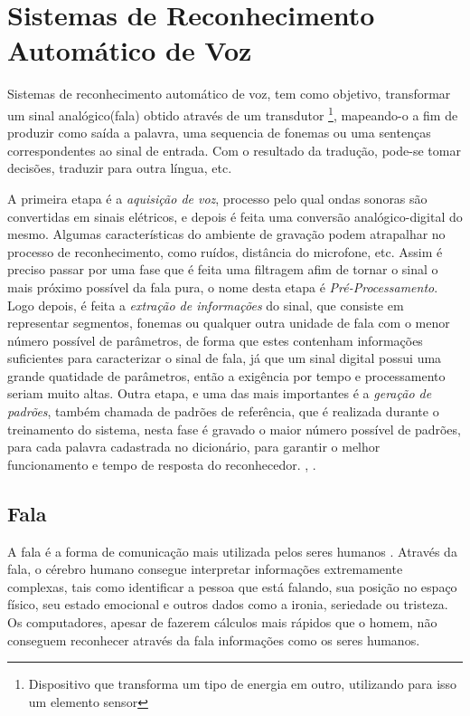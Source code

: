 \chapter{Sistemas de Reconhecimento Automático de Voz}

Sistemas de reconhecimento automático de voz, tem como objetivo, transformar um sinal analógico(fala) obtido através de um transdutor \footnote{Dispositivo que transforma um tipo de energia em outro, utilizando para isso um elemento sensor}, mapeando-o a fim de produzir como saída a palavra, uma sequencia de fonemas ou uma sentenças correspondentes ao sinal de entrada. Com o resultado da tradução, pode-se tomar decisões, traduzir para outra língua, etc.

A primeira etapa é a \textit{aquisição de voz}, processo pelo qual ondas sonoras são convertidas em sinais elétricos, e depois é feita uma conversão analógico-digital do mesmo. Algumas características do ambiente de gravação podem atrapalhar no processo de reconhecimento, como ruídos, distância do microfone, etc. Assim é preciso passar por uma fase que é feita uma filtragem afim de tornar o sinal o mais próximo possível da fala pura, o nome desta etapa é \textit{Pré-Processamento}. Logo depois, é feita a \textit{extração de informações} do sinal, que consiste em representar segmentos, fonemas ou qualquer outra unidade de fala com o menor número possível de parâmetros, de forma que estes contenham informações suficientes para caracterizar o sinal de fala, já que um sinal digital possui uma grande quatidade de parâmetros, então a exigência por tempo e processamento seriam muito altas. Outra etapa, e uma das mais importantes é a \textit{geração de padrões}, também chamada de padrões de referência, que é realizada durante o treinamento do sistema, nesta fase é gravado o maior número possível de padrões, para cada palavra cadastrada no dicionário, para garantir o melhor funcionamento e tempo de resposta do reconhecedor.
\cite{RavIsolAnderson}, \cite{RavComputLouzada}. 


\section{Fala}
A fala é a forma de comunicação mais utilizada pelos seres humanos \cite{RavCorporaCarlos}. Através da fala, o cérebro humano consegue interpretar informações extremamente complexas, tais como identificar a pessoa que está falando, sua posição no espaço físico, seu estado emocional e outros dados como a ironia, seriedade ou tristeza. Os computadores, apesar de fazerem cálculos mais rápidos que o homem, não conseguem reconhecer através da fala informações como os seres humanos.

